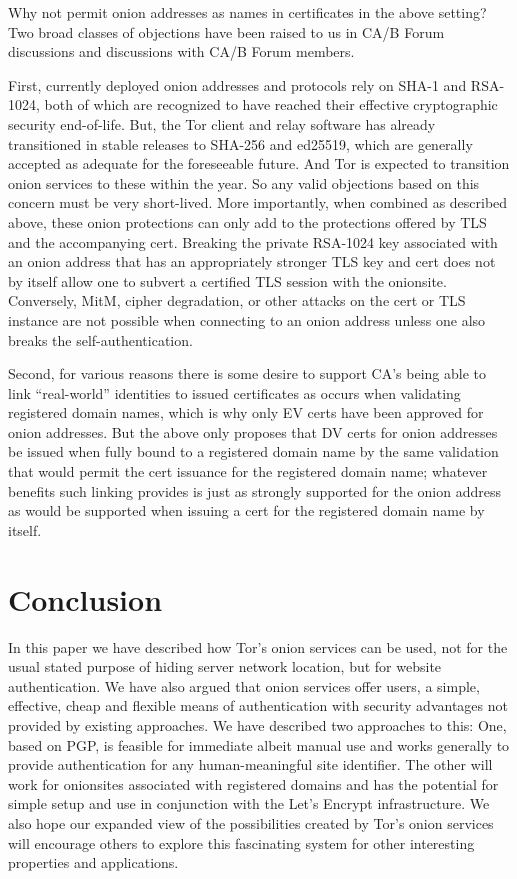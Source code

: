 \documentclass[10pt, conference, compsocconf]{styles/IEEEtran}
\begin{document}
Why not permit onion addresses as names in certificates in the above
setting? Two broad classes of objections have been raised to us in
CA/B Forum discussions and discussions with CA/B Forum members.

First, currently deployed onion addresses and protocols rely on SHA-1
and RSA-1024, both of which are recognized to have reached their
effective cryptographic security end-of-life. But, the Tor client and
relay software has already transitioned in stable releases to SHA-256
and ed25519, which are generally accepted as adequate for the
foreseeable future. And Tor is expected to transition onion services
to these within the year. So any valid objections based on this
concern must be very short-lived.  More importantly, when combined as
described above, these onion protections can only add to the
protections offered by TLS and the accompanying cert. Breaking the
private RSA-1024 key associated with an onion address that has an
appropriately stronger TLS key and cert does not by itself allow one
to subvert a certified TLS session with the onionsite. Conversely,
MitM, cipher degradation, or other attacks on the cert or TLS instance
are not possible when connecting to an onion address unless one also breaks
the self-authentication.

Second, for various reasons there is some desire to support CA's being
able to link ``real-world'' identities to issued certificates as
occurs when validating registered domain names, which is why only EV
certs have been approved for onion addresses. But the above only
proposes that DV certs for onion addresses be issued when fully bound
to a registered domain name by the same validation that would permit
the cert issuance for the registered domain name; whatever benefits
such linking provides is just as strongly supported for the onion
address as would be supported when issuing a cert for the registered
domain name by itself.

\section{Conclusion}

In this paper we have described how Tor's onion services can be used,
not for the usual stated purpose of hiding server network location,
but for website authentication.  We have also argued that onion
services offer users, a simple, effective, cheap and flexible means of
authentication with security advantages not provided by existing
approaches. We have described two approaches to this: One, based on
PGP, is feasible for immediate albeit manual use and works generally
to provide authentication for any human-meaningful site identifier. 
The other will work for onionsites associated with registered domains
and has the potential for simple setup and use in conjunction with the
Let's Encrypt infrastructure.  We also hope our expanded view of the
possibilities created by Tor's onion services will encourage others to
explore this fascinating system for other interesting properties and
applications.
\end{document}
